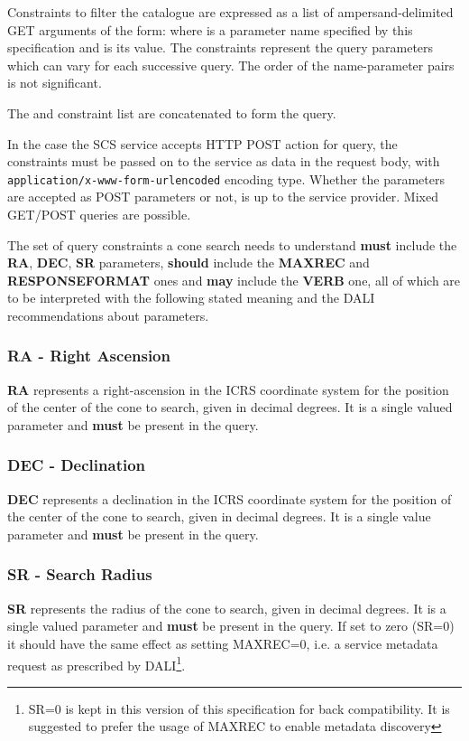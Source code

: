 \documentclass[11pt,a4paper]{ivoa}
\begin{document}
Constraints to filter the catalogue are expressed as a list of ampersand-delimited GET arguments of the form:  where  is a parameter name specified by this specification and  is its value. The constraints represent the query parameters which can vary for each successive query. The order of the name-parameter pairs is not significant.

The  and constraint list are concatenated to form the query.

In the case the SCS service accepts HTTP POST action for query, the  constraints must be passed on to the service as data in the request body, with \texttt{application/x-www-form-urlencoded} encoding type. Whether the  parameters are accepted as POST parameters or not, is up to the service provider. Mixed GET/POST queries are possible.

The set of query constraints a cone search needs to understand \textbf{must} include the \textbf{RA}, \textbf{DEC}, \textbf{SR} parameters, \textbf{should} include the \textbf{MAXREC} and \textbf{RESPONSEFORMAT} ones and \textbf{may} include the \textbf{VERB} one, all of which are to be interpreted with the following stated meaning and the DALI recommendations about parameters.

\subsubsection{RA - Right Ascension}
\textbf{RA} represents a right-ascension in the ICRS coordinate system for the position of the center of the cone to search, given in decimal degrees. It is a single valued parameter and \textbf{must} be present in the query.

\subsubsection{DEC - Declination}
\textbf{DEC} represents a declination in the ICRS coordinate system for the position of the center of the cone to search, given in decimal degrees. It is a single value parameter and \textbf{must} be present in the query.

\subsubsection{SR - Search Radius}
\textbf{SR} represents the radius of the cone to search, given in decimal degrees. It is a single valued parameter and \textbf{must} be present in the query. If set to zero (SR=0) it should have the same effect as setting MAXREC=0, i.e. a service metadata request as prescribed by DALI\footnote{SR=0 is kept in this version of this specification for back compatibility. It is suggested to prefer the usage of MAXREC to enable metadata discovery}.
\end{document}
